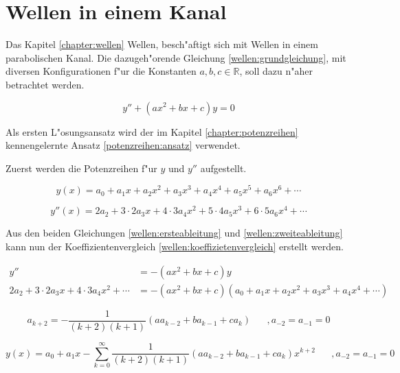 \chapter{Wellen in einem Kanal\label{chapter:wellen}}
\begin{refsection}

Das Kapitel \ref{chapter:wellen} Wellen, besch"aftigt sich mit Wellen in einem 
parabolischen Kanal. Die dazugeh"orende Gleichung \ref{wellen:grundgleichung}, 
mit diversen Konfigurationen f"ur die Konstanten ${a,b,c} \in \mathbb{R}$, soll 
dazu n"aher betrachtet werden.

\begin{equation}
	y'' + (ax^2+bx+c)y
	=
	0
	\label{wellen:grundgleichung}
\end{equation}

Als ersten L"osungsansatz wird der im Kapitel \ref{chapter:potenzreihen} 
kennengelernte Ansatz \ref{potenzreihen:ansatz} verwendet.

Zuerst werden die Potenzreihen f"ur $y$ und $y''$ aufgestellt.

\begin{equation}
	y(x)
	=
	a_0 + a_1x + a_2x^2 + a_3x^3 + a_4x^4 + a_5x^5 + a_6x^6 + \dotsb
	\label{wellen:ersteableitung}
\end{equation}

\begin{equation}
	y''(x)
	=
	2a_2 + 3 \mathbin{\cdot} 2a_3x + 4 \mathbin{\cdot} 3a_4x^2 + 5 
	\mathbin{\cdot} 4a_5x^3 + 6 \mathbin{\cdot} 5a_6x^4 + \dotsb
	\label{wellen:zweiteableitung}
\end{equation}

Aus den beiden Gleichungen \ref{wellen:ersteableitung} und 
\ref{wellen:zweiteableitung} kann nun der Koeffizientenvergleich 
\ref{wellen:koeffizietenvergleich} erstellt werden.

\begin{equation}
	\begin{split}
		y''
		&=
		-(ax^2+bx+c)y \\
		2a_2 + 3 \mathbin{\cdot} 2a_3x + 4 \mathbin{\cdot} 3a_4x^2 + \dotsb
		&=
		-(ax^2+bx+c)(a_0 + a_1x + a_2x^2 + a_3x^3 + a_4x^4 + \dotsb)
	\end{split}
	\label{wellen:koeffizietenvergleich}
\end{equation}

\begin{equation}
	a_{k+2} = -\frac{1}{(k+2)(k+1)} (aa_{k-2}+ba_{k-1}+ca_k)
	\hspace{20pt}, a_{-2} = a_{-1} = 0
	\label{wellen:koeffizientengleichung}
\end{equation}

\begin{equation}
	y(x) = a_0 + a_1x 
	-\sum_{k=0}^{\infty}\frac{1}{(k+2)(k+1)}(aa_{k-2}+ba_{k-1}+ca_k)x^{k+2}
	\hspace{20pt}, a_{-2} = a_{-1} = 0
	\label{wellen:ygleichung}
\end{equation}

\printbibliography[heading=subbibliography]
\end{refsection}